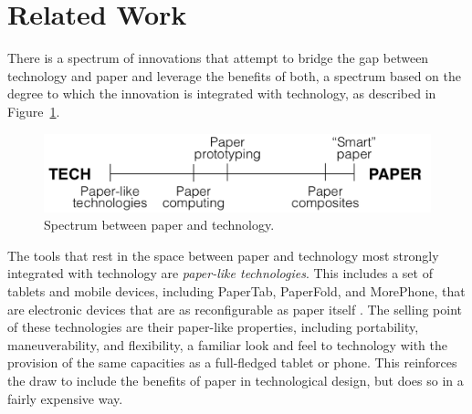 \documentclass{sig-alternate}
\begin{document}


\section{Related Work}

There is a spectrum of innovations that attempt to bridge the gap between technology and paper and leverage the benefits of both, a spectrum based on the degree to which the innovation is integrated with technology, as described in Figure~\ref{fig:spectrum}.

\begin{figure}
\centering
\includegraphics[width=\linewidth]{img/spectrum.png}
\caption{Spectrum between paper and technology.}
\label{fig:spectrum}
\end{figure}



The tools that rest in the space between paper and technology most strongly integrated with technology are \emph{paper-like technologies}. This includes a set of tablets and mobile devices, including PaperTab, PaperFold, and MorePhone, that are electronic devices that are as reconfigurable as paper itself \cite{gomes2014,gomes2013,tarun2013}. The selling point of these technologies are their paper-like properties, including portability, maneuverability, and flexibility, a familiar look and feel to technology with the provision of the same capacities as a full-fledged tablet or phone. This reinforces the draw to include the benefits of paper in technological design, but does so in a fairly expensive way.
\end{document}
